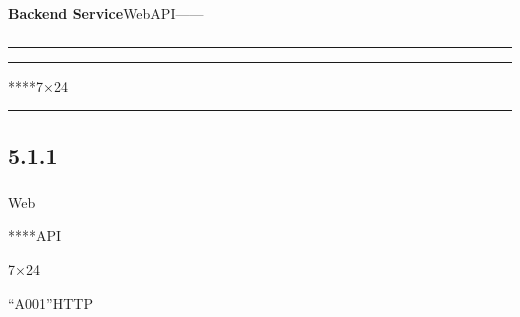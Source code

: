 \textbf{Backend Service}WebAPI------

\subsubsection{}\label{section-14}

\begin{center}\rule{0.5\linewidth}{0.5pt}\end{center}

\begin{center}\rule{0.5\linewidth}{0.5pt}\end{center}

****7×24

\begin{center}\rule{0.5\linewidth}{0.5pt}\end{center}

\subsection{5.1.1}\label{section-15}

\subsubsection{}\label{section-16}

Web

****API

7×24

``A001''HTTP


